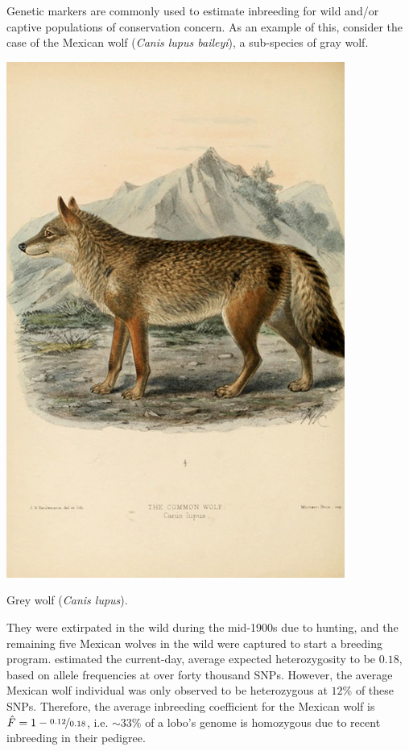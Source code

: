 {{Genetic markers are commonly used to estimate inbreeding for wild
and/or captive populations of conservation concern. As an example of
this, consider the case of the Mexican wolf ({\it Canis lupus baileyi}), a sub-species of gray wolf. \begin{marginfigure}[-2cm]
\begin{center}
  \includegraphics[width= \textwidth]{illustration_images/alleles_genotypes/grey_wolf/5988399184_0c36a8e51c_z.jpg}
\end{center}
\caption{Grey wolf ({\it Canis lupus}). } \label{fig:Grey_wolf}
\end{marginfigure} They were extirpated in the wild during the mid-1900s due to hunting, and the remaining five Mexican wolves in the wild were captured to start a breeding program. \citet{vonHoldt:11} estimated the current-day, average expected heterozygosity to be $0.18$, based on allele frequencies at over forty thousand SNPs. However, the average Mexican wolf individual was only observed to be heterozygous at $12\%$ of these SNPs. Therefore, the average inbreeding coefficient for the Mexican wolf is $\hat{F} = 1 -\nicefrac{0.12}{0.18}$, i.e. $\sim 33 \%$ of a lobo's genome is homozygous due to recent inbreeding in their pedigree.

}}
